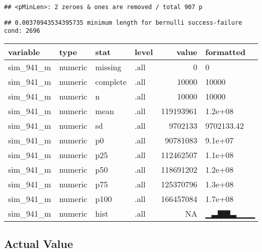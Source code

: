 \documentclass[]{article}
\newenvironment{Shaded}{\begin{snugshade}}{\end{snugshade}}
\newcommand{\DecValTok}[1]{\textcolor[rgb]{0.00,0.00,0.81}{#1}}
\newcommand{\KeywordTok}[1]{\textcolor[rgb]{0.13,0.29,0.53}{\textbf{#1}}}
\newcommand{\NormalTok}[1]{#1}
\newcommand{\OperatorTok}[1]{\textcolor[rgb]{0.81,0.36,0.00}{\textbf{#1}}}
\newcommand{\StringTok}[1]{\textcolor[rgb]{0.31,0.60,0.02}{#1}}
\begin{document}
\begin{verbatim}
## <pMinLen>: 2 zeroes & ones are removed / total 907 p
\end{verbatim}

\begin{verbatim}
## 0.00370943534395735 minimum length for bernulli success-failure cond: 2696
\end{verbatim}

\begin{tabular}{l|l|l|l|r|l}
\hline
variable & type & stat & level & value & formatted\\
\hline
sim\_941\_m & numeric & missing & .all & 0 & 0\\
\hline
sim\_941\_m & numeric & complete & .all & 10000 & 10000\\
\hline
sim\_941\_m & numeric & n & .all & 10000 & 10000\\
\hline
sim\_941\_m & numeric & mean & .all & 119193961 & 1.2e+08\\
\hline
sim\_941\_m & numeric & sd & .all & 9702133 & 9702133.42\\
\hline
sim\_941\_m & numeric & p0 & .all & 90781083 & 9.1e+07\\
\hline
sim\_941\_m & numeric & p25 & .all & 112462507 & 1.1e+08\\
\hline
sim\_941\_m & numeric & p50 & .all & 118691202 & 1.2e+08\\
\hline
sim\_941\_m & numeric & p75 & .all & 125370796 & 1.3e+08\\
\hline
sim\_941\_m & numeric & p100 & .all & 166457084 & 1.7e+08\\
\hline
sim\_941\_m & numeric & hist & .all & NA & ▁▃▇▇▃▁▁▁\\
\hline
\end{tabular}

\hypertarget{actual-value}{%
\subsection{Actual Value}\label{actual-value}}

\begin{Shaded}
\end{Shaded}
\end{document}
